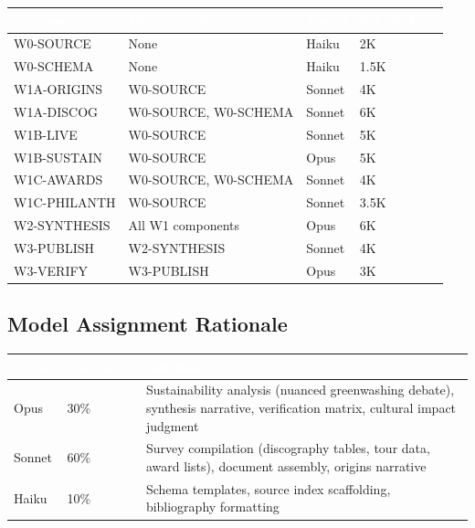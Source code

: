 \documentclass[11pt,letterpaper]{article}
\newcommand{\tableheader}[1]{\textbf{\sffamily\textcolor{white}{#1}}}
\begin{document}
\begin{center}
\begin{tabularx}{\textwidth}{L{2.5cm}L{2.5cm}C{1.5cm}C{1.5cm}}
\toprule
{}
\tableheader{Component} & \tableheader{Dependencies} & \tableheader{Model} & \tableheader{Est.\ Tokens} \\
\midrule
W0-SOURCE & None & Haiku & 2K \\
W0-SCHEMA & None & Haiku & 1.5K \\
W1A-ORIGINS & W0-SOURCE & Sonnet & 4K \\
W1A-DISCOG & W0-SOURCE, W0-SCHEMA & Sonnet & 6K \\
W1B-LIVE & W0-SOURCE & Sonnet & 5K \\
W1B-SUSTAIN & W0-SOURCE & Opus & 5K \\
W1C-AWARDS & W0-SOURCE, W0-SCHEMA & Sonnet & 4K \\
W1C-PHILANTH & W0-SOURCE & Sonnet & 3.5K \\
W2-SYNTHESIS & All W1 components & Opus & 6K \\
W3-PUBLISH & W2-SYNTHESIS & Sonnet & 4K \\
W3-VERIFY & W3-PUBLISH & Opus & 3K \\
\bottomrule
\end{tabularx}
\end{center}

\subsection{Model Assignment Rationale}

\begin{center}
\begin{tabularx}{\textwidth}{C{1.5cm}C{1.5cm}X}
\toprule
{}
\tableheader{Model} & \tableheader{Allocation} & \tableheader{Rationale} \\
\midrule
Opus & 30\% & Sustainability analysis (nuanced greenwashing debate), synthesis narrative, verification matrix, cultural impact judgment \\
Sonnet & 60\% & Survey compilation (discography tables, tour data, award lists), document assembly, origins narrative \\
Haiku & 10\% & Schema templates, source index scaffolding, bibliography formatting \\
\bottomrule
\end{tabularx}
\end{center}
\end{document}
